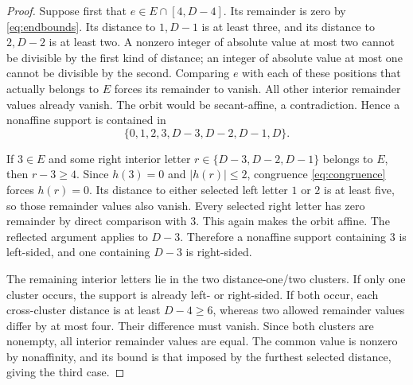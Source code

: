 \begin{proof}
Suppose first that $e\in E\cap[4,D-4]$. Its remainder is zero by
\eqref{eq:endbounds}. Its distance to $1,D-1$ is at least three,
and its distance to $2,D-2$ is at least two. A nonzero integer of
absolute value at most two cannot be divisible by the first kind
of distance; an integer of absolute value at most one cannot be
divisible by the second. Comparing $e$ with each of these positions
that actually belongs to $E$ forces its remainder to vanish.
All other interior remainder values already vanish. The orbit would
be secant-affine, a contradiction. Hence a nonaffine support is
contained in
\begin{equation}\label{eq:eightpositions}
 \{0,1,2,3,D-3,D-2,D-1,D\}.
\end{equation}

If $3\in E$ and some right interior letter
$r\in\{D-3,D-2,D-1\}$ belongs to $E$, then $r-3\ge4$.
Since $h(3)=0$ and $|h(r)|\le2$, congruence
\eqref{eq:congruence} forces $h(r)=0$. Its distance to either
selected left letter $1$ or $2$ is at least five, so those remainder
values also vanish. Every selected right letter has zero remainder
by direct comparison with $3$. This again makes the orbit affine.
The reflected argument applies to $D-3$. Therefore a nonaffine
support containing $3$ is left-sided, and one containing $D-3$
is right-sided.

The remaining interior letters lie in the two distance-one/two
clusters. If only one cluster occurs, the support is already left-
or right-sided. If both occur, each cross-cluster distance is at
least $D-4\ge6$, whereas two allowed remainder values differ by
at most four. Their difference must vanish. Since both clusters
are nonempty, all interior remainder values are equal. The common
value is nonzero by nonaffinity, and its bound is that imposed by
the furthest selected distance, giving the third case.
\end{proof}

